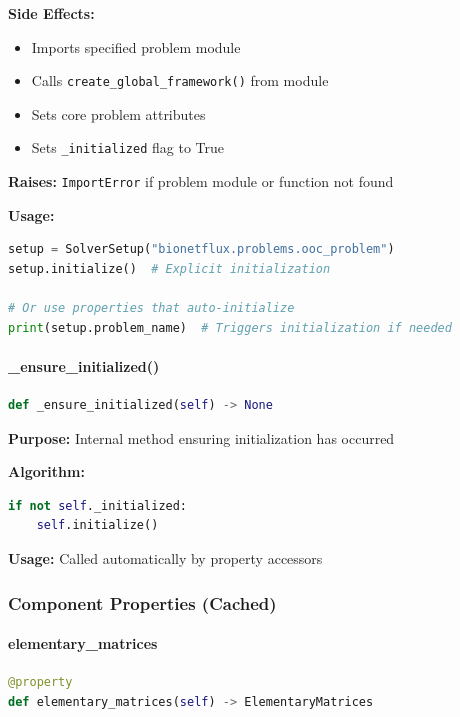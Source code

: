 \textbf{Side Effects:}
\begin{itemize}
    \item Imports specified problem module
    \item Calls \texttt{create\_global\_framework()} from module
    \item Sets core problem attributes
    \item Sets \texttt{\_initialized} flag to True
\end{itemize}

\textbf{Raises:} \texttt{ImportError} if problem module or function not found

\textbf{Usage:}
\begin{lstlisting}[language=Python, caption=Initialize Usage]
setup = SolverSetup("bionetflux.problems.ooc_problem")
setup.initialize()  # Explicit initialization

# Or use properties that auto-initialize
print(setup.problem_name)  # Triggers initialization if needed
\end{lstlisting}

\paragraph{\_ensure\_initialized()}\leavevmode
\begin{lstlisting}[language=Python, caption=Ensure Initialized Method]
def _ensure_initialized(self) -> None
\end{lstlisting}

\textbf{Purpose:} Internal method ensuring initialization has occurred

\textbf{Algorithm:}
\begin{lstlisting}[language=Python, caption=Ensure Initialized Implementation]
if not self._initialized:
    self.initialize()
\end{lstlisting}

\textbf{Usage:} Called automatically by property accessors

\subsubsection{Component Properties (Cached)}

\paragraph{elementary\_matrices}\leavevmode
\begin{lstlisting}[language=Python, caption=Elementary Matrices Property]
@property
def elementary_matrices(self) -> ElementaryMatrices
\end{lstlisting}

